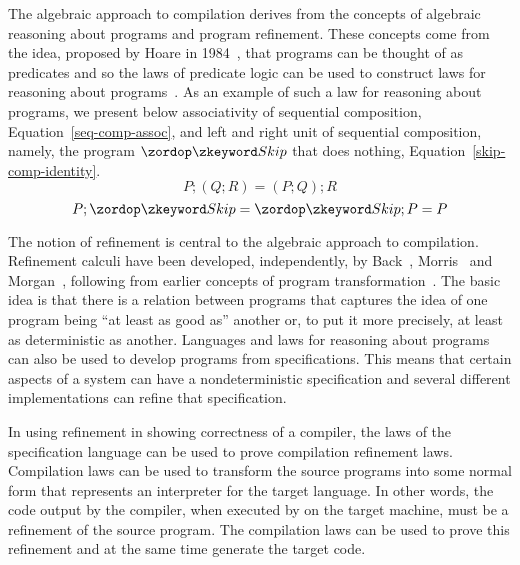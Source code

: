\documentclass[a4paper,10pt]{report}
\begin{document}
The algebraic approach to compilation derives from the concepts of algebraic
reasoning about programs and program refinement. These concepts come from the
idea, proposed by Hoare in 1984~\cite{hoare1984}, that programs can be thought
of as predicates and so the laws of predicate logic can be used to construct
laws for reasoning about programs~\cite{hoare1987}. As an example of such a law
for reasoning about programs, we present below associativity of sequential
composition, Equation~\eqref{seq-comp-assoc}, and left and right unit of
sequential composition, namely, the program $\Skip$ that does nothing,
Equation~\eqref{skip-comp-identity}.
\begin{equation}
  \label{seq-comp-assoc}
  P;(Q;R) = (P;Q);R
\end{equation}
\begin{equation}
  \label{skip-comp-identity}
  P;\Skip = \Skip;P = P
\end{equation}

The notion of refinement is central to the algebraic approach to compilation.
Refinement calculi have been developed, independently, by Back~\cite{back1981},
Morris~\cite{morris1987} and Morgan~\cite{morgan1990}, following from earlier
concepts of program transformation~\cite{bauer1976, balzer1976, standish1976,
  arsac1979}.  The basic idea is that there is a relation between programs that
captures the idea of one program being ``at least as good as'' another or, to
put it more precisely, at least as deterministic as another.  Languages and laws
for reasoning about programs can also be used to develop programs from
specifications.  This means that certain aspects of a system can have a
nondeterministic specification and several different implementations can refine
that specification.

In using refinement in showing correctness of a compiler, the laws of the
specification language can be used to prove compilation refinement laws.
Compilation laws can be used to transform the source programs into some normal
form that represents an interpreter for the target language.  In other words,
the code output by the compiler, when executed by on the target machine, must be
a refinement of the source program.  The compilation laws can be used to prove
this refinement and at the same time generate the target code.
\end{document}
